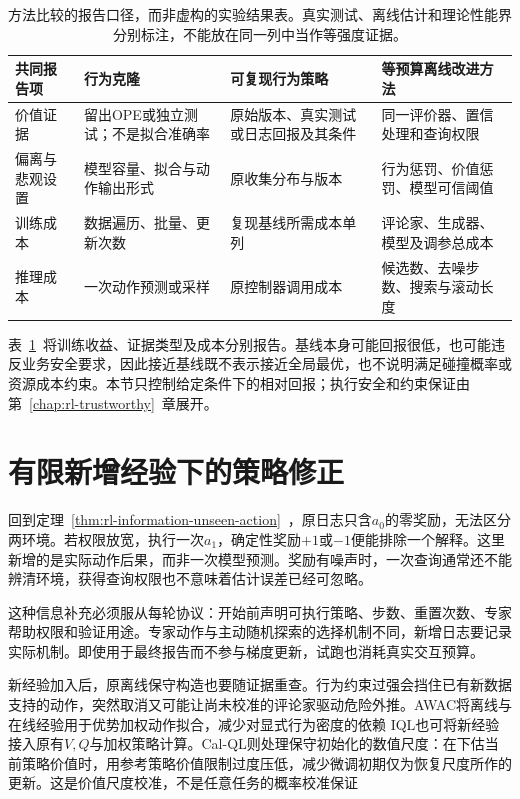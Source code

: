 \begin{table}[t]
  \centering
  \small
  \begin{tabularx}{\linewidth}{p{28mm}XXX}
    \toprule
    共同报告项 & 行为克隆 & 可复现行为策略 & 等预算离线改进方法 \\
    \midrule
    价值证据 & 留出OPE或独立测试；不是拟合准确率 & 原始版本、真实测试或日志回报及其条件 & 同一评价器、置信处理和查询权限 \\
    偏离与悲观设置 & 模型容量、拟合与动作输出形式 & 原收集分布与版本 & 行为惩罚、价值惩罚、模型可信阈值 \\
    训练成本 & 数据遍历、批量、更新次数 & 复现基线所需成本单列 & 评论家、生成器、模型及调参总成本 \\
    推理成本 & 一次动作预测或采样 & 原控制器调用成本 & 候选数、去噪步数、搜索与滚动长度 \\
    \bottomrule
  \end{tabularx}
  \caption{方法比较的报告口径，而非虚构的实验结果表。真实测试、离线估计和理论性能界分别标注，不能放在同一列中当作等强度证据。}
  \label{tab:rl-information-reporting}
\end{table}

表~\ref{tab:rl-information-reporting}~将训练收益、证据类型及成本分别报告。基线本身可能回报很低，也可能违反业务安全要求，因此接近基线既不表示接近全局最优，也不说明满足碰撞概率或资源成本约束。本节只控制给定条件下的相对回报；执行安全和约束保证由第~\ref{chap:rl-trustworthy}~章展开。

\section{有限新增经验下的策略修正}
\label{sec:rl-information-limited-interaction}

回到定理~\ref{thm:rl-information-unseen-action}~，原日志只含$a_0$的零奖励，无法区分两环境。若权限放宽，执行一次$a_1$，确定性奖励$+1$或$-1$便能排除一个解释。这里新增的是实际动作后果，而非一次模型预测。奖励有噪声时，一次查询通常还不能辨清环境，获得查询权限也不意味着估计误差已经可忽略。

这种信息补充必须服从每轮协议：开始前声明可执行策略、步数、重置次数、专家帮助权限和验证用途。专家动作与主动随机探索的选择机制不同，新增日志要记录实际机制。即使用于最终报告而不参与梯度更新，试跑也消耗真实交互预算。

新经验加入后，原离线保守构造也要随证据重查。行为约束过强会挡住已有新数据支持的动作，突然取消又可能让尚未校准的评论家驱动危险外推。AWAC将离线与在线经验用于优势加权动作拟合，减少对显式行为密度的依赖
IQL也可将新经验接入原有$V,Q$与加权策略计算。Cal-QL则处理保守初始化的数值尺度：在下估当前策略价值时，用参考策略价值限制过度压低，减少微调初期仅为恢复尺度所作的更新。这是价值尺度校准，不是任意任务的概率校准保证

